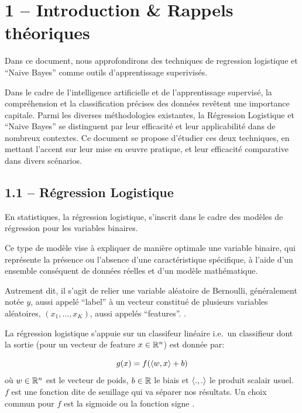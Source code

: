 \documentclass[
]{article}
\author{}
\date{}
\begin{document}
\intro{}

\hypertarget{introduction-rappels-thuxe9oriques}{%
\section{1 -- Introduction \& Rappels
théoriques}\label{introduction-rappels-thuxe9oriques}}

Dans ce document, nous approfondirons des techniques de regression
logistique et ``Naive Bayes'' comme outils d'apprentissage superivisés.

Dans le cadre de l'intelligence artificielle et de l'apprentissage
supervisé, la compréhension et la classification précises des données
revêtent une importance capitale. Parmi les diverses méthodologies
existantes, la Régression Logistique et ``Naive Bayes'' se distinguent
par leur efficacité et leur applicabilité dans de nombreux contextes. Ce
document se propose d'étudier ces deux techniques, en mettant l'accent
sur leur mise en œuvre pratique, et leur efficacité comparative dans
divers scénarios.

\hypertarget{ruxe9gression-logistique}{%
\subsection{1.1 -- Régression
Logistique}\label{ruxe9gression-logistique}}

En statistiques, la régression logistique, s'inscrit dans le cadre des
modèles de régression pour les variables binaires.

Ce type de modèle vise à expliquer de manière optimale une variable
binaire, qui représente la présence ou l'absence d'une caractéristique
spécifique, à l'aide d'un ensemble conséquent de données réelles et d'un
modèle mathématique.

Autrement dit, il s'agit de relier une variable aléatoire de Bernoulli,
généralement notée \(y\), aussi appelé ``label'' à un vecteur constitué
de plusieurs variables aléatoires, \((x_1, \ldots, x_K)\), aussi appelés
``features''. \cite{RegressionLogistique2023}.

La régression logistique s'appuie sur un classifeur linéaire
\cite{ClassifieurLineaire2022} i.e.~un classifieur dont la sortie (pour
un vecteur de feature \(x \in \mathbb{R}^n\)) est donnée par:

\[
g(x) = f(\langle w, x \rangle + b)
\] où \(w \in \mathbb{R}^n\) est le vecteur de poids, \(b \in \mathbb{R}\) le biais et
\(\langle ., . \rangle\) le produit scalair usuel. \(f\) est une fonction
dite de seuillage qui va séparer nos résultats. Un choix commun pour
\(f\) est la sigmoide ou la fonction signe
\cite{ClassifieurLineaire2022}.
\end{document}
